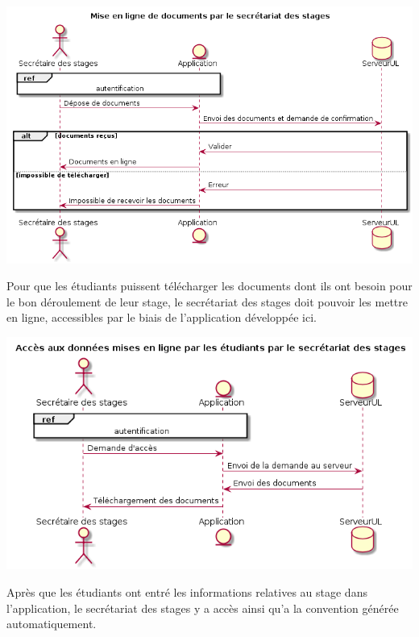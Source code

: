 \documentclass{scrreprt}
\begin{document}
\begin{center}
	\includegraphics[scale=0.55]{image/miseEnLigneDocumentsParSecretaire.png}
\end{center}
\hspace{1cm}Pour que les étudiants puissent télécharger les documents dont ils ont besoin pour le bon déroulement de leur stage, le secrétariat des stages doit pouvoir les mettre en ligne, accessibles par le biais de l'application développée ici.

\begin{center}
	\includegraphics[scale=0.55]{image/accesDonneesParSecretaire.png}
\end{center}
\hspace{1cm}Après que les étudiants ont entré les informations relatives au stage dans l'application, le secrétariat des stages y a accès ainsi qu'a la convention générée automatiquement.
\end{document}
